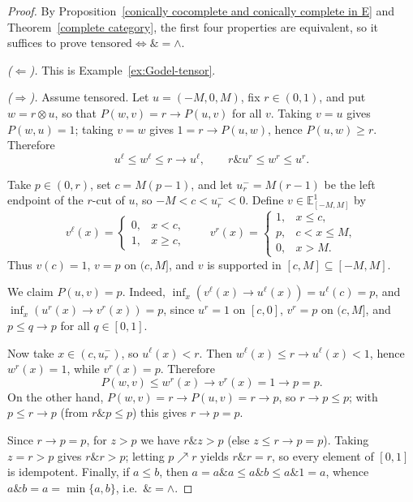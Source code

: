 \documentclass[preprint,3p,times]{elsarticle}
\theoremstyle{plain}
\theoremstyle{definition}
\numberwithin{equation}{section}
\begin{document}
\begin{proof}
By Proposition~\ref{conically cocomplete and conically complete in E} and
Theorem~\ref{complete category}, the first four properties are equivalent,
so it suffices to prove \(\text{tensored}\iff\&=\wedge\).

\emph{($\Leftarrow$).} This is Example~\ref{ex:Godel-tensor}.

\emph{($\Rightarrow$).} Assume tensored. Let \(u=(-M,0,M)\), fix
\(r\in(0,1)\), and put \(w=r\otimes u\), so that \(P(w,v)=r\to P(u,v)\) for
all \(v\). Taking \(v=u\) gives \(P(w,u)=1\); taking \(v=w\) gives
\(1=r\to P(u,w)\), hence \(P(u,w)\ge r\). Therefore
\[
u^\ell\le w^\ell\le r\to u^\ell,\qquad r\mathbin{\&}u^r\le w^r\le u^r.
\]

Take \(p\in(0,r)\), set \(c=M(p-1)\), and let \(u_r^-=M(r-1)\) be the left
endpoint of the \(r\)-cut of \(u\), so \(-M<c<u_r^-<0\). Define
\(v\in\mathbb E^1_{[-M,M]}\) by
\[
v^\ell(x)=\begin{cases}0,&x<c,\\1,&x\ge c,\end{cases}\qquad
v^r(x)=\begin{cases}1,&x\le c,\\p,&c<x\le M,\\0,&x>M.\end{cases}
\]
Thus \(v(c)=1\), \(v=p\) on \((c,M]\), and \(v\) is supported in
\([c,M]\subseteq[-M,M]\).

We claim \(P(u,v)=p\). Indeed, \(\inf_x(v^\ell(x)\to u^\ell(x))=u^\ell(c)=p\),
and \(\inf_x(u^r(x)\to v^r(x))=p\), since \(u^r=1\) on \([c,0]\), \(v^r=p\)
on \((c,M]\), and \(p\le q\to p\) for all \(q\in[0,1]\).

Now take \(x\in(c,u_r^-)\), so \(u^\ell(x)<r\). Then
\(w^\ell(x)\le r\to u^\ell(x)<1\), hence \(w^r(x)=1\), while \(v^r(x)=p\).
Therefore
\[
P(w,v)\le w^r(x)\to v^r(x)=1\to p=p.
\]
On the other hand, \(P(w,v)=r\to P(u,v)=r\to p\), so \(r\to p\le p\); with
\(p\le r\to p\) (from \(r\mathbin{\&}p\le p\)) this gives \(r\to p=p\).

Since \(r\to p=p\), for \(z>p\) we have \(r\mathbin{\&z}>p\) (else
\(z\le r\to p=p\)). Taking \(z=r>p\) gives \(r\mathbin{\&}r>p\); letting
\(p\nearrow r\) yields \(r\mathbin{\&}r=r\), so every element of \([0,1]\) is
idempotent. Finally, if \(a\le b\), then
\(a=a\mathbin{\&}a\le a\mathbin{\&}b\le a\mathbin{\&}1=a\), whence
\(a\mathbin{\&}b=a=\min\{a,b\}\), i.e.\ \(\&=\wedge\).
\end{proof}
\end{document}
